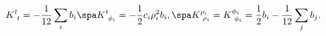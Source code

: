 \begin{equation}
K^t_{\ t} = - \frac{1}{12} \sum_i b_i
\spa
K^t_{\ \phi_i} = - \frac{1}{2} c_i \rho_i^2 b_i,
\spa
K^{\rho_i}_{\ \rho_i} = K^{\phi_i}_{\ \phi_i} = \frac{1}{2} b_i 
- \frac{1}{12} \sum_j b_j.
\end{equation}


